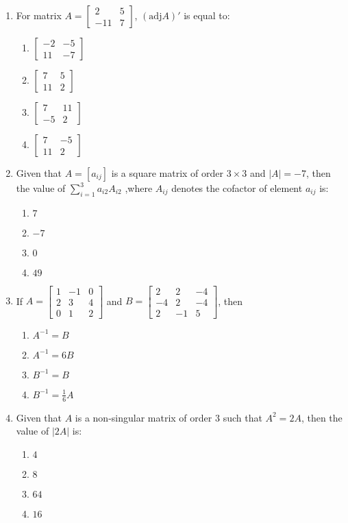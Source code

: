 \documentclass{article}
\newcommand{\myvec}[1]{\begin{bmatrix}#1\end{bmatrix}}
\begin{document}
\begin{enumerate}
    \item For matrix $A =\myvec{2&5 \\-11&7}$,
    $(\text{adj}A)'$ is equal to:
    \begin{enumerate}
        \item $\myvec{-2&-5\\11&-7}$
        \item $\myvec{7&5\\ 11&2}$
        \item $\myvec{7 &11\\-5&2}$
        \item $\myvec{7 & -5 \\11 & 2}$
    \end{enumerate}

    \item Given that $A = [a_{ij}]$ is a square matrix of order $3 \times 3$ and $|A| = -7$, then the value of  $\sum_{i=1}^{3} a_{i2}A_{i2}$ ,where $A_{ij}$ denotes the cofactor of element $a_{ij}$ is:
    \begin{enumerate}
        \item $7$
        \item $-7$
        \item $0$
        \item $49$
    \end{enumerate}
    
    \item If $A =\myvec{1 &-1 & 0 \\2&3 & 4 \\0&1&2}$ and $B = \myvec{2&2&-4\\-4&2&-4\\2&-1&5}$, then
    \begin{enumerate}
        \item $A^{-1} = B$
        \item $A^{-1} = 6B$
        \item $B^{-1} = B$
        \item $B^{-1} = \frac{1}{6} A$
    \end{enumerate}
    \item Given that $A$ is a non-singular matrix of order $3$ such that $A^2 = 2A$, then the value of $|2A|$ is:
    \begin{enumerate}
        \item $4$
        \item $8$
        \item $64$
        \item $16$
    \end{enumerate}
    

\end{enumerate}
\end{document}
